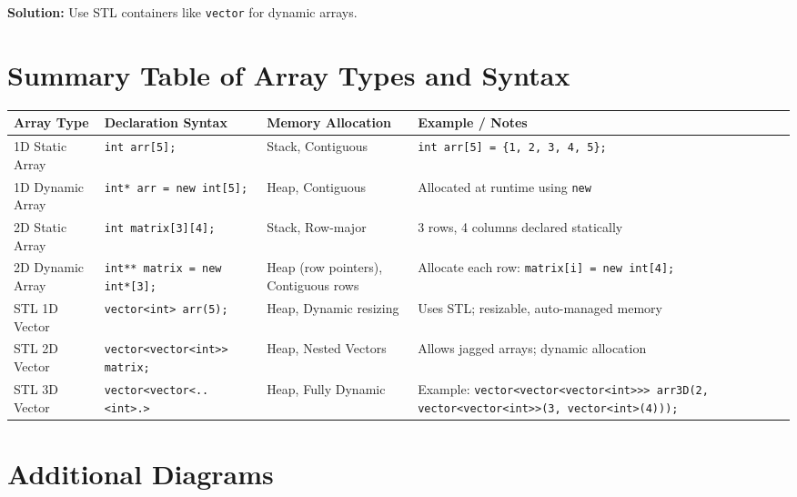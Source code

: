 \textbf{Solution:} Use STL containers like \texttt{vector} for dynamic arrays.

\section{Summary Table of Array Types and Syntax}
\begin{center}
\scriptsize %
\renewcommand{\arraystretch}{1.5}
\begin{tabular}{|l|p{3.2cm}|p{3.2cm}|p{4.5cm}|}
\hline
\textbf{Array Type} & \textbf{Declaration Syntax} & \textbf{Memory Allocation} & \textbf{Example / Notes} \\\hline

1D Static Array & \texttt{int arr[5];} & Stack, Contiguous & \texttt{int arr[5] = \{1, 2, 3, 4, 5\};} \\\hline

1D Dynamic Array & \texttt{int* arr = new int[5];} & Heap, Contiguous & Allocated at runtime using \texttt{new} \\\hline

2D Static Array & \texttt{int matrix[3][4];} & Stack, Row-major & 3 rows, 4 columns declared statically \\\hline

2D Dynamic Array & \texttt{int** matrix = new int*[3];} & Heap (row pointers), Contiguous rows & Allocate each row: \texttt{matrix[i] = new int[4];} \\\hline

STL 1D Vector & \texttt{vector<int> arr(5);} & Heap, Dynamic resizing & Uses STL; resizable, auto-managed memory \\\hline

STL 2D Vector & \texttt{vector<vector<int>> matrix;} & Heap, Nested Vectors & Allows jagged arrays; dynamic allocation \\\hline

STL 3D Vector & \texttt{vector<vector<..<int>.>} & Heap, Fully Dynamic & Example: \texttt{vector<vector<vector<int>>> arr3D(2, vector<vector<int>>(3, vector<int>(4)));} \\\hline
\end{tabular}
\end{center}


\section{Additional Diagrams}
